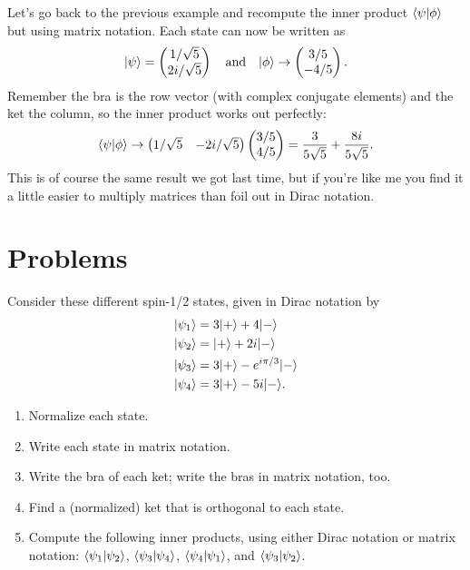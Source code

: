 \begin{example}
Let's go back to the previous example and recompute the inner product $\langle \psi | \phi \rangle$ but using matrix notation.  Each state can now be written as 
\[
| \psi \rangle = \begin{pmatrix} 1/\sqrt{5} \\ 2i/\sqrt{5} \end{pmatrix} \quad \text{and} \quad | \phi \rangle \to \begin{pmatrix} 3/5 \\ -4/5 \end{pmatrix}.
\]
Remember the bra is the row vector (with complex conjugate elements) and the ket the column, so the inner product works out perfectly:
\[
\langle \psi | \phi \rangle \to \begin{pmatrix} 1/\sqrt{5} & -2i/\sqrt{5} \end{pmatrix} \begin{pmatrix} 3/5 \\ 4/ 5 \end{pmatrix} = \frac{3}{5\sqrt{5}} + \frac{8i}{5\sqrt{5}}.
\]
This is of course the same result we got last time, but if you're like me you find it a little easier to multiply matrices than foil out in Dirac notation.  

\end{example}

\section*{Problems}
%

\begin{problem}
Consider these different spin-1/2 states, given in Dirac notation by
\begin{align*}
| \psi_1 \rangle &= 3 | + \rangle + 4| - \rangle \\
| \psi_2 \rangle &= | + \rangle + 2i | - \rangle \\
| \psi_3 \rangle &= 3 | + \rangle - e^{i\pi/3}| - \rangle \\
| \psi_4 \rangle &= 3 | + \rangle - 5i| - \rangle.
\end{align*}
\begin{enumerate}[label=(\alph*)]
\item Normalize each state.
\item Write each state in matrix notation.
\item Write the bra of each ket; write the bras in matrix notation, too.
\item Find a (normalized) ket that is orthogonal to each state.
\item Compute the following inner products, using either Dirac notation or matrix notation:  $\langle \psi_1 | \psi_2 \rangle$, $\langle \psi_3 | \psi_4 \rangle$, $\langle \psi_4 | \psi_1 \rangle$, and $\langle \psi_3 | \psi_2 \rangle$.
\end{enumerate}
\end{problem}


